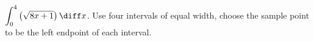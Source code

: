 \label{problemRiemannSum-sqrt(8x+1)} $\displaystyle \int_0^4 \left(\sqrt{8x+1}\right)\diff x$. Use four intervals of equal width, choose the sample point to be the left endpoint of each interval. 


